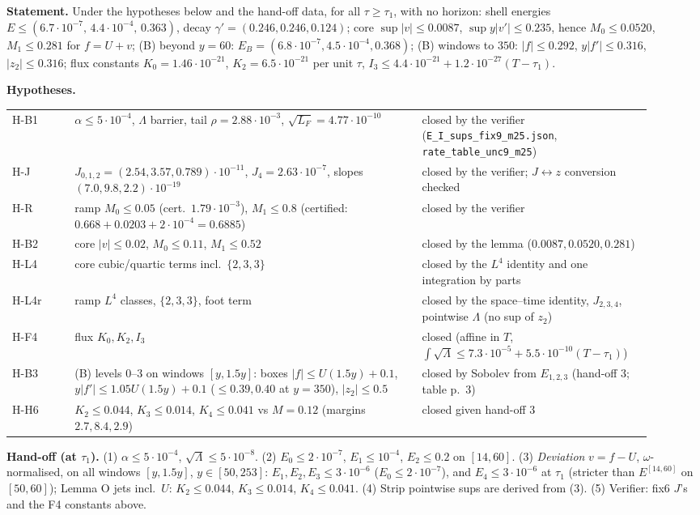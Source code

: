 \documentclass[11pt]{article}
\begin{document}
\noindent\textbf{Statement.} Under the hypotheses below and the hand-off data, for all $\tau\ge\tau_1$, with no horizon: shell energies $E\le(6.7\cdot10^{-7},\,4.4\cdot10^{-4},\,0.363)$, decay $\gamma'=(0.246,0.246,0.124)$; core $\sup|v|\le0.0087$, $\sup y|v'|\le0.235$, hence $M_0\le0.0520$, $M_1\le0.281$ for $f=U+v$; (B) beyond $y=60$: $E_B=(6.8\cdot10^{-7},4.5\cdot10^{-4},0.368)$; (B) windows to $350$: $|f|\le0.292$, $y|f'|\le0.316$, $|z_2|\le0.316$; flux constants $K_0=1.46\cdot10^{-21}$, $K_2=6.5\cdot10^{-21}$ per unit $\tau$, $I_3\le4.4\cdot10^{-21}+1.2\cdot10^{-27}(T-\tau_1)$.

\noindent\textbf{Hypotheses.}
\begin{center}\begin{tabular}{p{0.09\linewidth}p{0.50\linewidth}p{0.33\linewidth}}
H-B1 & $\alpha\le5\cdot10^{-4}$, $\Lambda$ barrier, tail $\rho=2.88\cdot10^{-3}$, $\sqrt{L_F}=4.77\cdot10^{-10}$ & closed by the verifier (\texttt{E\_I\_sups\_fix9\_m25.json}, \texttt{rate\_table\_unc9\_m25})\\
H-J & $J_{0,1,2}=(2.54,3.57,0.789)\cdot10^{-11}$, $J_4=2.63\cdot10^{-7}$, slopes $(7.0,9.8,2.2)\cdot10^{-19}$ & closed by the verifier; $J\leftrightarrow z$ conversion checked\\
H-R & ramp $M_0\le0.05$ (cert.\ $1.79\cdot10^{-3}$), $M_1\le0.8$ (certified: $0.668+0.0203+2\cdot10^{-4}=0.6885$) & closed by the verifier\\
H-B2 & core $|v|\le0.02$, $M_0\le0.11$, $M_1\le0.52$ & closed by the lemma ($0.0087,0.0520,0.281$)\\
H-L4 & core cubic/quartic terms incl.\ $\{2,3,3\}$ & closed by the $L^4$ identity and one integration by parts\\
H-L4r & ramp $L^4$ classes, $\{2,3,3\}$, foot term & closed by the space--time identity, $J_{2,3,4}$, pointwise $\Lambda$ (no sup of $z_2$)\\
H-F4 & flux $K_0,K_2,I_3$ & closed (affine in $T$, $\int\sqrt\Lambda\le7.3\cdot10^{-5}+5.5\cdot10^{-10}(T-\tau_1)$)\\
H-B3 & (B) levels 0--3 on windows $[y,1.5y]$: boxes $|f|\le U(1.5y)+0.1$, $y|f'|\le1.05U(1.5y)+0.1$ ($\le0.39,0.40$ at $y=350$), $|z_2|\le0.5$ & closed by Sobolev from $E_{1,2,3}$ (hand-off 3; table p.~3)\\
H-H6 & $K_2\le0.044$, $K_3\le0.014$, $K_4\le0.041$ vs $M=0.12$ (margins $2.7,8.4,2.9$) & closed given hand-off 3\\
\end{tabular}\end{center}
\noindent\textbf{Hand-off (at $\tau_1$).} (1) $\alpha\le5\cdot10^{-4}$, $\sqrt\Lambda\le5\cdot10^{-8}$. (2) $E_0\le2\cdot10^{-7}$, $E_1\le10^{-4}$, $E_2\le0.2$ on $[14,60]$. (3) \emph{Deviation} $v=f-U$, $\omega$-normalised, on all windows $[y,1.5y]$, $y\in[50,253]$: $E_1,E_2,E_3\le3\cdot10^{-6}$ ($E_0\le2\cdot10^{-7}$), and $E_4\le3\cdot10^{-6}$ at $\tau_1$ (stricter than $E^{[14,60]}$ on $[50,60]$); Lemma O jets incl.\ $U$: $K_2\le0.044$, $K_3\le0.014$, $K_4\le0.041$. (4) Strip pointwise sups are derived from (3). (5) Verifier: fix6 $J$'s and the F4 constants above.
\end{document}
